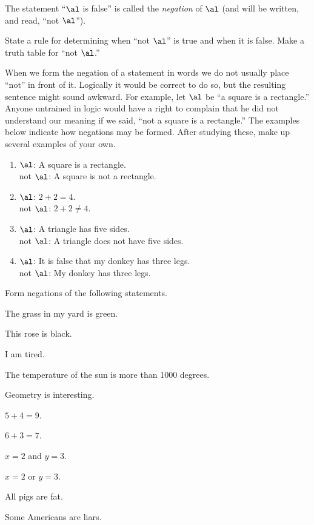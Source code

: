 \documentclass[11pt]{book}
\theoremstyle{bkplain}
\theoremstyle{XIplainnote}
\theoremstyle{bkplain}
\theoremstyle{bkplain}
\begin{document}
\begin{definition}
The statement ``$\al$ is false'' is called the \emph{negation} of $\al$ (and will
be written, and read, ``not $\al$'').
\end{definition}

\begin{IIproblem}
State a rule for determining when ``not $\al$'' is true and when
it is false. Make a truth table for ``not $\al$.''
\end{IIproblem}

When we form the negation of a statement in words we do not usually place ``not''
in front of it. Logically it would be correct to do so, but the resulting
sentence might sound awkward. For example, let $\al$ be ``a square is a
rectangle.'' Anyone untrained in logic would have a right to complain that he did
not understand our meaning if we said, ``not a square is a rectangle.'' The
examples below indicate how negations may be formed. After studying these, make
up several examples of your own.

\begin{enumerate}[label=(\alph*), leftmargin=2.6em, itemsep=3pt, topsep=3pt]
\item $\al$: A square is a rectangle.\\
      not $\al$: A square is not a rectangle.
\item $\al$: $2 + 2 = 4$.\\
      not $\al$: $2 + 2 \neq 4$.
\item $\al$: A triangle has five sides.\\
      not $\al$: A triangle does not have five sides.
\item $\al$: It is false that my donkey has three legs.\\
      not $\al$: My donkey has three legs.
\end{enumerate}


Form negations of the following statements.

\begin{exercisecols}
\begin{exlist}
\item The grass in my yard is green.
\item This rose is black.
\item I am tired.
\item The temperature of the sun is more than 1000 degrees.
\item Geometry is interesting.
\item $5 + 4 = 9$.
\item $6 + 3 = 7$.
\item[\stex 8.] $x = 2$ and $y = 3$.
\item[\stex 9.] $x = 2$ or $y = 3$.
\item[\stex 10.] All pigs are fat.
\item[\stex 11.] Some Americans are liars.
\end{exlist}
\end{exercisecols}
\IIstarnote{}
\end{document}
